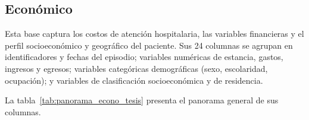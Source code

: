 \subsection{Económico}

Esta base captura los costos de atención hospitalaria, las variables financieras y el perfil socioeconómico y geográfico del paciente. Sus 24 columnas se agrupan en identificadores y fechas del episodio; variables numéricas de estancia, gastos, ingresos y egresos; variables categóricas demográficas (sexo, escolaridad, ocupación); y variables de clasificación socioeconómica y de residencia.

La tabla~\ref{tab:panorama_econo_tesis} presenta el panorama general de sus columnas.

\begin{table}[H]
\centering
\small
\caption{Panorama general de columnas — Económico}
\label{tab:panorama_econo_tesis}
\end{table}
